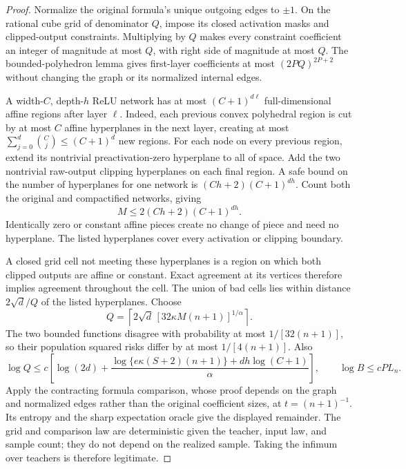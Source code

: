 \begin{proof}
Normalize the original formula's unique outgoing edges to $\pm1$. On the rational cube grid of denominator $Q$, impose its closed activation masks and clipped-output constraints. Multiplying by $Q$ makes every constraint coefficient an integer of magnitude at most $Q$, with right side of magnitude at most $Q$. The bounded-polyhedron lemma gives first-layer coefficients at most $(2PQ)^{2P+2}$ without changing the graph or its normalized internal edges.

A width-$C$, depth-$h$ ReLU network has at most $(C+1)^{d\ell}$ full-dimensional affine regions after layer $\ell$. Indeed, each previous convex polyhedral region is cut by at most $C$ affine hyperplanes in the next layer, creating at most $\sum_{j=0}^d\binom Cj\le(C+1)^d$ new regions. For each node on every previous region, extend its nontrivial preactivation-zero hyperplane to all of space. Add the two nontrivial raw-output clipping hyperplanes on each final region. A safe bound on the number of hyperplanes for one network is
$(Ch+2)(C+1)^{dh}$. Count both the original and compactified networks, giving
\[
 M\le2(Ch+2)(C+1)^{dh}.
\]
Identically zero or constant affine pieces create no change of piece and need no hyperplane. The listed hyperplanes cover every activation or clipping boundary.

A closed grid cell not meeting these hyperplanes is a region on which both clipped outputs are affine or constant. Exact agreement at its vertices therefore implies agreement throughout the cell. The union of bad cells lies within distance $2\sqrt d/Q$ of the listed hyperplanes. Choose
\[
 Q=\left\lceil2\sqrt d\,[32\kappa M(n+1)]^{1/\alpha}\right\rceil.
\]
The two bounded functions disagree with probability at most $1/[32(n+1)]$, so their population squared risks differ by at most $1/[4(n+1)]$. Also
\[
 \log Q\le c\left[\log(2d)+
      \frac{\log\{e\kappa(S+2)(n+1)\}+dh\log(C+1)}\alpha\right],
 \qquad \log B\le cP L_n.
\]
Apply the contracting formula comparison, whose proof depends on the graph and normalized edges rather than the original coefficient sizes, at $t=(n+1)^{-1}$. Its entropy and the sharp expectation oracle give the displayed remainder. The grid and comparison law are deterministic given the teacher, input law, and sample count; they do not depend on the realized sample. Taking the infimum over teachers is therefore legitimate.
\end{proof}

